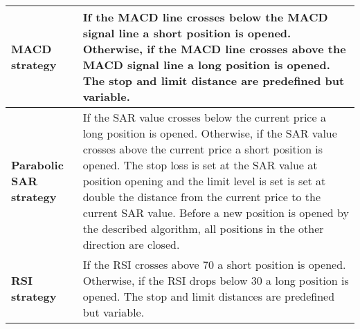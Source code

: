 \begin{tabular}{L{4cm}|p{11cm}}
    \midrule
    \textbf{MACD strategy}                               & If the MACD line crosses below the MACD signal line a short position is opened. Otherwise, if the MACD line crosses above the MACD signal line a long position is opened. The stop and limit distance are predefined but variable.                                                                                                                                                                                                                   \\
    \midrule
    \textbf{Parabolic SAR strategy}                      & If the SAR value crosses below the current price a long position is opened. Otherwise, if the SAR value crosses above the current price a short position is opened. The stop loss is set at the SAR value at position opening and the limit level is set is set at double the distance from the current price to the current SAR value. Before a new position is opened by the described algorithm, all positions in the other direction are closed. \\
    \midrule
    \textbf{RSI strategy}                                & If the RSI crosses above 70 a short position is opened. Otherwise, if the RSI drops below 30 a long position is opened. The stop and limit distances are predefined but variable.                                                                                                                                                                                                                                                                    \\
    \bottomrule
\end{tabular}